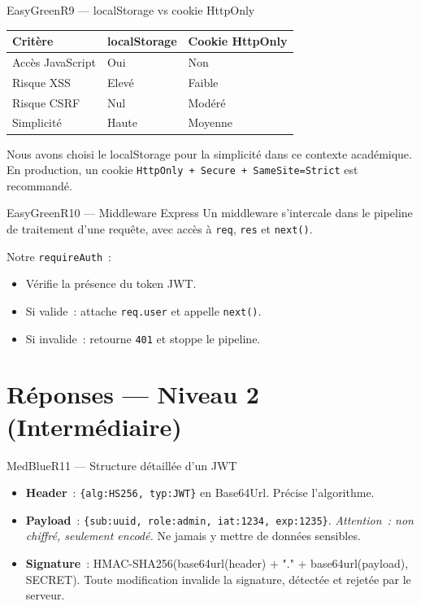 \documentclass[12pt,a4paper,oneside]{report}
\begin{document}
\begin{qbox}{EasyGreen}{R9 --- localStorage vs cookie HttpOnly}
\begin{tabular}{@{}lll@{}}
\toprule
\textbf{Critère} & \textbf{localStorage} & \textbf{Cookie HttpOnly} \\
\midrule
Accès JavaScript & Oui   & Non    \\
Risque XSS       & Elevé & Faible \\
Risque CSRF      & Nul   & Modéré \\
Simplicité       & Haute & Moyenne\\
\bottomrule
\end{tabular}

\vspace{4pt}
Nous avons choisi le localStorage pour la simplicité dans ce contexte
académique. En production, un cookie \texttt{HttpOnly + Secure +
SameSite=Strict} est recommandé.
\end{qbox}

\begin{qbox}{EasyGreen}{R10 --- Middleware Express}
Un middleware s'intercale dans le pipeline de traitement d'une requête,
avec accès à \texttt{req}, \texttt{res} et \texttt{next()}.

Notre \texttt{requireAuth}~:
\begin{itemize}
  \item Vérifie la présence du token JWT.
  \item Si valide~: attache \texttt{req.user} et appelle
        \texttt{next()}.
  \item Si invalide~: retourne \texttt{401} et stoppe le pipeline.
\end{itemize}
\end{qbox}

\vspace{0.5cm}

\section*{\textcolor{MedBlue}{Réponses --- Niveau 2 (Intermédiaire)}}

\begin{qbox}{MedBlue}{R11 --- Structure détaillée d'un JWT}
\begin{itemize}
  \item \textbf{Header}~: \texttt{\{alg:HS256, typ:JWT\}} en Base64Url.
        Précise l'algorithme.
  \item \textbf{Payload}~: \texttt{\{sub:uuid, role:admin, iat:1234,
        exp:1235\}}. \textit{Attention~: non chiffré, seulement encodé.}
        Ne jamais y mettre de données sensibles.
  \item \textbf{Signature}~: HMAC-SHA256(base64url(header) + "." +
        base64url(payload), SECRET). Toute modification invalide la
        signature, détectée et rejetée par le serveur.
\end{itemize}
\end{qbox}
\end{document}
